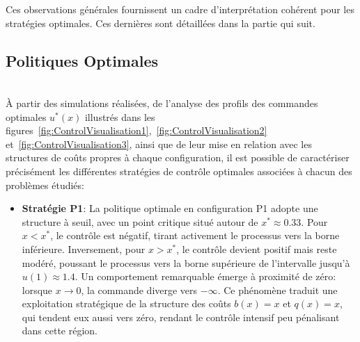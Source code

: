 Ces observations générales fournissent un cadre d'interprétation cohérent pour les stratégies optimales. Ces dernières sont détaillées dans la partie qui suit.
\subsection{Politiques Optimales}\phantom{}\\
À partir des simulations réalisées, de l'analyse des profils des commandes optimales \( u^*(x) \) illustrés dans les figures~\ref{fig:ControlVisualisation1},~\ref{fig:ControlVisualisation2} et~\ref{fig:ControlVisualisation3}, ainsi que de leur mise en relation avec les structures de coûts propres à chaque configuration, il est possible de caractériser précisément les différentes stratégies de contrôle optimales associées à chacun des problèmes étudiés:
\begin{itemize}
    \item \textbf{Stratégie P1}: La politique optimale en configuration P1 adopte une structure à seuil, avec un point critique situé autour de \(x^* \approx 0.33\). Pour \(x < x^*\), le contrôle est négatif, tirant activement le processus vers la borne inférieure. Inversement, pour \(x > x^*\), le contrôle devient positif mais reste modéré, poussant le processus vers la borne supérieure de l'intervalle jusqu'à \(u(1)\approx1.4\). Un comportement remarquable émerge à proximité de zéro: lorsque \(x \to 0\), la commande diverge vers \(-\infty\). Ce phénomène traduit une exploitation stratégique de la structure des coûts \(b(x) = x\) et \(q(x) = x\), qui tendent eux aussi vers zéro, rendant le contrôle intensif peu pénalisant dans cette région.


\end{itemize}
